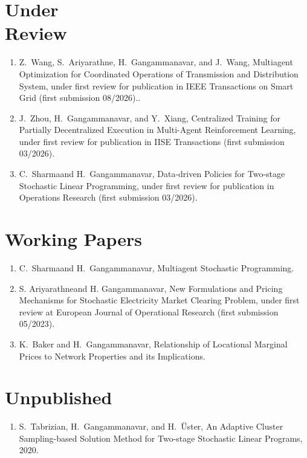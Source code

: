 \documentclass[hyperref, margin]{myResume}
\newif\ifpublic
\begin{document}
\begin{resume}
\section{Under\\Review}
\begin{enumerate}[label=R\arabic*., leftmargin=*] 
	\item Z.\ Wang\footnotemark[1], S.\ Ariyarathne\footnotemark[1], H.\ Gangammanavar, and J.\ Wang, Multiagent Optimization for Coordinated Operations of Transmission and Distribution System, \ifpublic 2026 (first review). \else under first review for publication in IEEE Transactions on Smart Grid (first submission 08/2026).\fi.
	\item J.\ Zhou, H.\ Gangammanavar, and Y.\ Xiang, Centralized Training for Partially Decentralized Execution in Multi-Agent Reinforcement Learning, \ifpublic 2026 (first revision). \else under first review for publication in IISE Transactions (first submission 03/2026).\fi
	\item C.\ Sharma\footnotemark[4] and H.\ Gangammanavar, Data-driven Policies for Two-stage Stochastic Linear Programming, \ifpublic 2026 (first review). \else under first review for publication in Operations Research (first submission 03/2026).\fi
\end{enumerate}

\section{Working Papers}
\begin{enumerate}[label=W\arabic*., leftmargin=*]
	\item C.\ Sharma\footnotemark[4] and H.\ Gangammanavar, Multiagent Stochastic Programming. 
	\item S. Ariyarathne\footnotemark[1] and H. Gangammanavar, New Formulations and Pricing Mechanisms for Stochastic Electricity Market Clearing Problem, \ifpublic 2026. \else under first review at European Journal of Operational Research (first submission 05/2023).\fi	
	\item K.\ Baker and H.\ Gangammanavar, Relationship of Locational Marginal Prices to Network Properties and its Implications.		
\end{enumerate}

\section{Unpublished}
\begin{enumerate}[label=U\arabic*., leftmargin=*]
	\item S.\ Tabrizian\footnotemark[1], H.\ Gangammanavar, and H.\ \"{U}ster, An Adaptive Cluster Sampling-based Solution Method for Two-stage Stochastic Linear Programs, 2020. 
\end{enumerate}


\end{resume}
\end{document}
